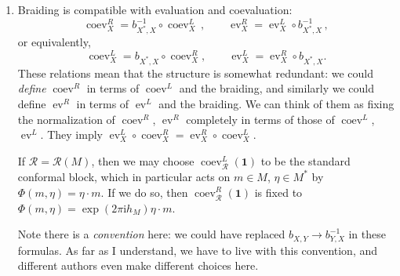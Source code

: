 \documentclass[12pt,letterpaper,reqno]{amsart}
\numberwithin{equation}{section}
\newcommand{\I}{{\mathrm i}}
\newcommand\bid{{\mathbf 1}}
\newcommand{\vrep}{\mathcal{R}}
\newcommand{\ti}[1]{\textit{#1}}
\DeclareMathOperator{\ev}{ev}
\DeclareMathOperator{\coev}{coev}
\DeclareRobustCommand{\fixme}[1]{\leavevmode{\color{orange}[#1]}}
\begin{document}
\begin{enumerate}


\item Braiding is compatible with evaluation and coevaluation:
%
\[
\coev_X^{R} = b^{-1}_{X^*,X} \circ \coev_X^{L} \, ,
\qquad
\ev_X^{R} = \ev_X^{L} \circ b^{-1}_{X^*,X} \, ,
\]
or equivalently,
\[
\coev_X^{L} = b_{X^*,X}\circ \coev_X^{R},
\qquad
\ev_X^{L} = \ev_X^{R}\circ b_{X^*,X}.
\]
These relations mean that the structure is somewhat redundant:
we could \ti{define} $\coev^R$ in terms of $\coev^L$ and the
braiding, and similarly we could define $\ev^R$ in terms of
$\ev^L$ and the braiding. We can think of them as
fixing the normalization of $\coev^R$, $\ev^R$ completely
in terms of those of $\coev^L$, $\ev^L$. 
They imply $\ev^L_X \circ \coev^R_X = \ev^R_X \circ \coev^L_X$.

\begin{example}
If $\vrep = \vrep(M)$, then we may choose 
$\coev^L_{\vrep}(\bid)$
to be the standard conformal block, which in particular acts
on $m \in M$, $\eta \in M^*$ by $\Phi(m,\eta) = \eta \cdot m$.
If we do so, then 
$\coev^R_{\vrep}(\bid)$ is fixed to \fixme{sign}
$\Phi(m,\eta) = \exp(2 \pi \I h_M) \eta \cdot m$.
\end{example}

Note there is a \ti{convention} here: we could have replaced
$b_{X,Y} \to b^{-1}_{Y,X}$ in these formulas. As far as I understand,
we have to live with this convention, and different authors
even make different choices here.





\end{enumerate}
\end{document}
